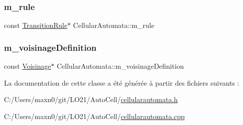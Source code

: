 \mbox{\label{class_cellular_automata_aac41608d613ea2ee9df3a55ad0a127f6}} 
\subsubsection{\texorpdfstring{m\+\_\+rule}{m\_rule}}
{\footnotesize\ttfamily const \mbox{\hyperlink{class_transition_rule}{Transition\+Rule}}$\ast$ Cellular\+Automata\+::m\+\_\+rule\hspace{0.3cm}{\ttfamily [private]}}

\mbox{\label{class_cellular_automata_a6990374e6bca2e228ff82ad5a3419833}} 
\subsubsection{\texorpdfstring{m\+\_\+voisinage\+Definition}{m\_voisinageDefinition}}
{\footnotesize\ttfamily const \mbox{\hyperlink{class_voisinage}{Voisinage}}$\ast$ Cellular\+Automata\+::m\+\_\+voisinage\+Definition\hspace{0.3cm}{\ttfamily [private]}}



La documentation de cette classe a été générée à partir des fichiers suivants \+:\begin{DoxyCompactItemize}
\item 
C\+:/\+Users/maxn0/git/\+L\+O21/\+Auto\+Cell/\mbox{\hyperlink{cellularautomata_8h}{cellularautomata.\+h}}\item 
C\+:/\+Users/maxn0/git/\+L\+O21/\+Auto\+Cell/\mbox{\hyperlink{cellularautomata_8cpp}{cellularautomata.\+cpp}}\end{DoxyCompactItemize}
